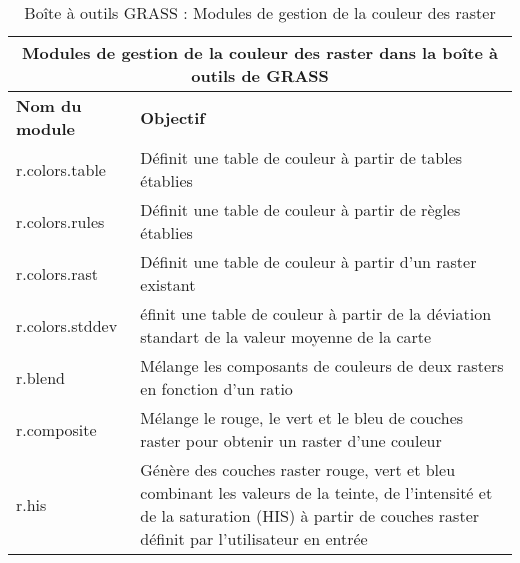 \begin{table}[H]
\centering
 \begin{tabular}{|p{4cm}|p{10cm}|}
  \hline \multicolumn{2}{|c|}{\textbf{Modules de gestion de la couleur des raster dans la boîte à outils de GRASS}} \\
  \hline \textbf{Nom du module} & \textbf{Objectif} \\
  \hline r.colors.table & Définit une table de couleur à partir de tables établies \\
  \hline r.colors.rules & Définit une table de couleur à partir de règles établies \\
  \hline r.colors.rast & Définit une table de couleur à partir d'un raster existant \\
  \hline r.colors.stddev & éfinit une table de couleur à partir de la déviation standart de la valeur moyenne de la carte \\
  \hline r.blend & Mélange les composants de couleurs de deux rasters en fonction d'un ratio \\
  \hline r.composite & Mélange le rouge, le vert et le bleu de couches raster pour obtenir un raster d'une couleur \\
  \hline r.his & Génère des couches raster rouge, vert et bleu combinant les valeurs de la teinte, de l'intensité et de la saturation (HIS) à partir de couches raster définit par l'utilisateur en entrée \\
\hline
\end{tabular}
\caption{Boîte à outils GRASS : Modules de gestion de la couleur des raster}
\end{table}

